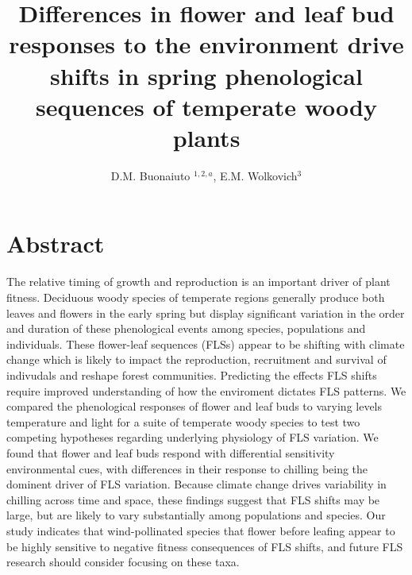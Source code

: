 \documentclass[11pt]{article}\usepackage[]{graphicx}\usepackage[]{color}
\title{Differences in flower and leaf bud responses to the environment drive shifts in spring phenological sequences of temperate woody plants}\\
\date{}
\author{D.M. Buonaiuto $^{1,2,a}$, E.M. Wolkovich$^{3}$}
\begin{document}
\maketitle
\section*{Abstract} 
The relative timing of growth and reproduction is an important driver of plant fitness. Deciduous woody species of temperate regions generally produce both leaves and flowers in the early spring but display significant variation in the order and duration of these phenological events among species, populations and individuals.   These flower-leaf sequences (FLSs) appear to be shifting with climate change which is likely to impact the reproduction, recruitment and survival of indivudals and reshape forest communities. Predicting the effects FLS shifts require improved understanding of how the enviroment dictates FLS patterns. We compared the phenological responses of flower and leaf buds to varying levels temperature and light for a suite of temperate woody species to test two competing hypotheses regarding underlying physiology of FLS variation. We found that flower and leaf buds respond with differential sensitivity environmental cues, with differences in their response to chilling being the dominent driver of FLS variation. Because climate change drives variability in chilling across time and space, these findings suggest that FLS shifts may be large, but are likely to vary substantially among populations and species. Our study indicates that wind-pollinated species that flower before leafing appear to be highly sensitive to negative fitness consequences of FLS shifts, and future FLS research should consider focusing on these taxa.  %
\end{document}
